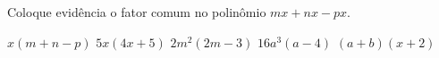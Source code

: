 Coloque evidência o fator comum no polinômio $mx+nx-px$.

$x(m+n-p)$
$5x(4x+5)$
$2m^2(2m-3)$
$16a^3(a-4)$
$(a+b)(x+2)$

